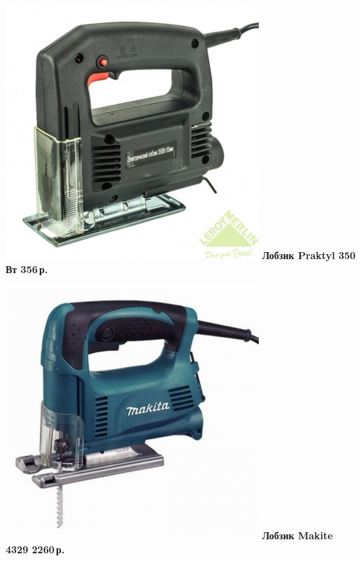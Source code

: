 \documentclass{magazine}
\begin{document}
\begin{multicols}{2}
\noindent\href{http://leroymerlin.ru/catalogue/instrumenty/elektroinstrument/lobziki/13805991/}{
\includegraphics[width=\columnwidth]{fig/00/LobzPraktyl.jpg}}
\textbf{Лобзик Praktyl 350 Вт 356\,р.}

\noindent\href{http://leroymerlin.ru/catalogue/instrumenty/elektroinstrument/lobziki/12114283/}{
\includegraphics[width=\columnwidth]{fig/00/LobzMakita4329.jpg}}
\textbf{Лобзик Makite 4329 2260\,р.}


\end{multicols}
\end{document}

